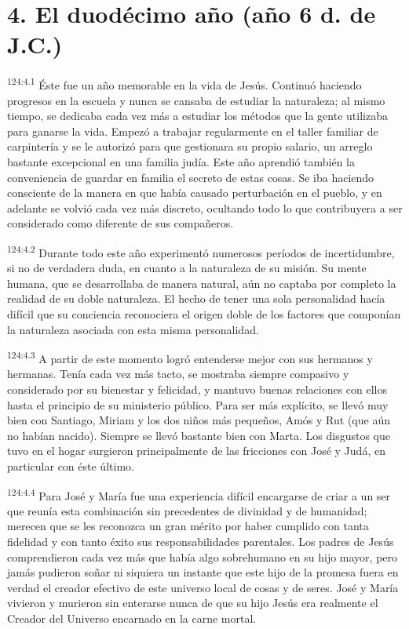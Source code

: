 \section*{4. El duodécimo año (año 6 d. de J.C.)}
\par
\textsuperscript{124:4.1} Éste fue un año memorable en la vida de Jesús. Continuó haciendo progresos en la escuela y nunca se cansaba de estudiar la naturaleza; al mismo tiempo, se dedicaba cada vez más a estudiar los métodos que la gente utilizaba para ganarse la vida. Empezó a trabajar regularmente en el taller familiar de carpintería y se le autorizó para que gestionara su propio salario, un arreglo bastante excepcional en una familia judía. Este año aprendió también la conveniencia de guardar en familia el secreto de estas cosas. Se iba haciendo consciente de la manera en que había causado perturbación en el pueblo, y en adelante se volvió cada vez más discreto, ocultando todo lo que contribuyera a ser considerado como diferente de sus compañeros.

\par
\textsuperscript{124:4.2} Durante todo este año experimentó numerosos períodos de incertidumbre, si no de verdadera duda, en cuanto a la naturaleza de su misión. Su mente humana, que se desarrollaba de manera natural, aún no captaba por completo la realidad de su doble naturaleza. El hecho de tener una sola personalidad hacía difícil que su conciencia reconociera el origen doble de los factores que componían la naturaleza asociada con esta misma personalidad.

\par
\textsuperscript{124:4.3} A partir de este momento logró entenderse mejor con sus hermanos y hermanas. Tenía cada vez más tacto, se mostraba siempre compasivo y considerado por su bienestar y felicidad, y mantuvo buenas relaciones con ellos hasta el principio de su ministerio público. Para ser más explícito, se llevó muy bien con Santiago, Miriam y los dos niños más pequeños, Amós y Rut (que aún no habían nacido). Siempre se llevó bastante bien con Marta. Los disgustos que tuvo en el hogar surgieron principalmente de las fricciones con José y Judá, en particular con éste último.

\par
\textsuperscript{124:4.4} Para José y María fue una experiencia difícil encargarse de criar a un ser que reunía esta combinación sin precedentes de divinidad y de humanidad; merecen que se les reconozca un gran mérito por haber cumplido con tanta fidelidad y con tanto éxito sus responsabilidades parentales. Los padres de Jesús comprendieron cada vez más que había algo sobrehumano en su hijo mayor, pero jamás pudieron soñar ni siquiera un instante que este hijo de la promesa fuera en verdad el creador efectivo de este universo local de cosas y de seres. José y María vivieron y murieron sin enterarse nunca de que su hijo Jesús era realmente el Creador del Universo encarnado en la carne mortal.

